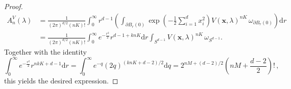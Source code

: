 \documentclass[10pt,a4paper]{amsart}
\newcommand{\bb}[1]{\boldsymbol{#1}}
\renewcommand{\d}{\mathrm{d}}
\begin{document}
\begin{proof}
  \begin{align*}
    A^V_n(\lambda) & = \frac{1}{(2\pi)^{d/2} (nK)!} \int_{0}^{\infty} r^{d-1} \left( \int_{\partial B_r(0)} \exp\left( -\frac{1}{2} \sum_{i=1}^{d} x_i^2 \right) V(\bb{x},\lambda)^{nK} \,\omega_{\partial B_r(0)} \right) \d r\\
    & = \frac{1}{(2\pi)^{d/2} (nK)!} \int_{0}^{\infty} e^{-\frac{r^2}{2}} r^{d-1 + knK} \d r \int_{S^{d-1}} V(\bb{x},\lambda)^{nK} \,\omega_{S^{d-1}}.
  \end{align*}
  Together with the identity
  \[
    \int_{0}^{\infty} e^{-\frac{r^2}{2}} r^{nkK+d-1} \d r = \int_{0}^{\infty} e^{-q} (2q)^{(knK + d-2)/2} \d q = 2^{nM + (d-2)/2} \left(nM + \frac{d-2}{2}\right)!\,,
  \]
  this yields the desired expression.
\end{proof}
\end{document}

